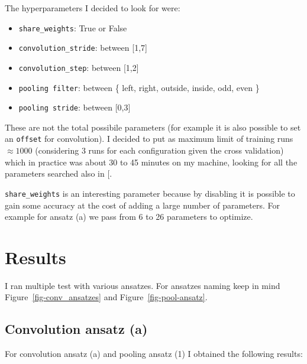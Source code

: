 \documentclass[
  13pt,
  a4paper,
  DIV=11,
  numbers=noendperiod]{scrreprt}
\providecommand{\tightlist}{%
  \setlength{\itemsep}{0pt}\setlength{\parskip}{0pt}}\usepackage{longtable,booktabs,array}
\begin{document}
The hyperparameters I decided to look for were:

\begin{itemize}
\tightlist
\item
  \texttt{share\_weights}: True or False
\item
  \texttt{convolution\_stride}: between {[}1,7{]}
\item
  \texttt{convolution\_step}: between {[}1,2{]}
\item
  \texttt{pooling\ filter}: between \{ left, right, outside, inside,
  odd, even \}
\item
  \texttt{pooling\ stride}: between {[}0,3{]}
\end{itemize}

These are not the total possibile parameters (for example it is also
possible to set an \texttt{offset} for convolution). I decided to put as
maximum limit of training runs \(\approx 1000\) (considering 3 runs for
each configuration given the cross validation) which in practice was
about 30 to 45 minutes on my machine, looking for all the parameters
searched also in {[}\citeproc{ref-lourens2023hierarchical}{1}{]}.

\texttt{share\_weights} is an interesting parameter because by disabling
it is possible to gain some accuracy at the cost of adding a large
number of parameters. For example for ansatz (a) we pass from 6 to 26
parameters to optimize.


\chapter{Results}\label{results}

I ran multiple test with various ansatzes. For ansatzes naming keep in
mind Figure~\ref{fig-conv_ansatzes} and Figure~\ref{fig-pool-ansatz}.

\section{Convolution ansatz (a)}\label{convolution-ansatz-a}

For convolution ansatz (a) and pooling ansatz (1) I obtained the
following results:
\end{document}
